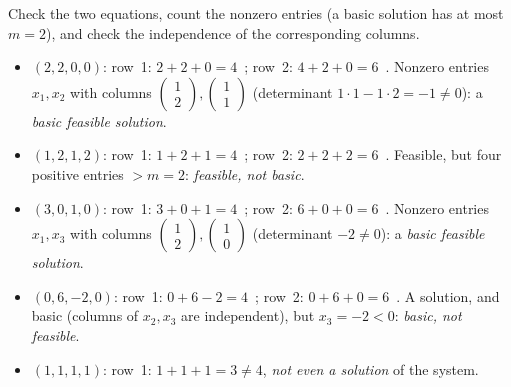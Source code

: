 \begin{solutions}
  \item Check the two equations, count the nonzero entries (a basic
        solution has at most $m=2$), and check the independence of the
        corresponding columns.
        \begin{itemize}[leftmargin=1.8em,itemsep=0.3ex]
          \item[(a)] $(2,2,0,0)$: row~1: $2+2+0=4$~\checkmark; row~2:
                $4+2+0=6$~\checkmark. Nonzero entries $x_{1},x_{2}$ with
                columns
                $\begin{pmatrix}1\\2\end{pmatrix},
                 \begin{pmatrix}1\\1\end{pmatrix}$
                (determinant $1\cdot 1-1\cdot 2=-1\ne 0$): a
                \emph{basic feasible solution}.
          \item[(b)] $(1,2,1,2)$: row~1: $1+2+1=4$~\checkmark; row~2:
                $2+2+2=6$~\checkmark. Feasible, but four positive entries
                $>m=2$: \emph{feasible, not basic}.
          \item[(c)] $(3,0,1,0)$: row~1: $3+0+1=4$~\checkmark; row~2:
                $6+0+0=6$~\checkmark. Nonzero entries $x_{1},x_{3}$ with
                columns
                $\begin{pmatrix}1\\2\end{pmatrix},
                 \begin{pmatrix}1\\0\end{pmatrix}$
                (determinant $-2\ne 0$): a \emph{basic feasible solution}.
          \item[(d)] $(0,6,-2,0)$: row~1: $0+6-2=4$~\checkmark; row~2:
                $0+6+0=6$~\checkmark. A solution, and basic (columns of
                $x_{2},x_{3}$ are independent), but $x_{3}=-2<0$:
                \emph{basic, not feasible}.
          \item[(e)] $(1,1,1,1)$: row~1: $1+1+1=3\ne 4$, \emph{not even
                a solution} of the system.
        \end{itemize}


\end{solutions}
